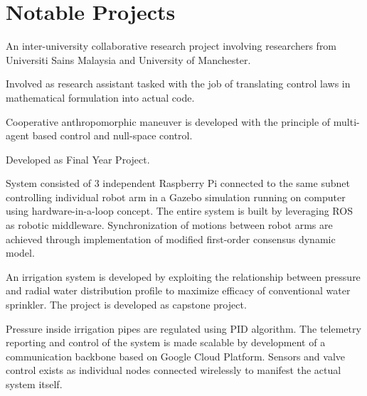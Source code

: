 \documentclass[letterpaper]{deedy-resume} %
\begin{document}
\begin{minipage}[t]{0.66\textwidth} %

\section{Notable Projects}

\vspace{\topsep}
\begin{tightitemize}
\item An inter-university collaborative research project involving researchers from Universiti Sains Malaysia and University of Manchester.
\item Involved as research assistant tasked with the job of translating control laws in mathematical formulation into actual code.
\item Cooperative anthropomorphic maneuver is developed with the principle of multi-agent based control and null-space control.
\end{tightitemize} 
\sectionspace %

\vspace{\topsep}
\begin{tightitemize}
\item Developed as Final Year Project.
\item System consisted of 3 independent Raspberry Pi connected to the same subnet controlling individual robot arm in a Gazebo simulation running on computer using hardware-in-a-loop concept. 
The entire system is built by leveraging ROS as robotic middleware. 
Synchronization of motions between robot arms are achieved through implementation of modified first-order consensus dynamic model.
\end{tightitemize} 
\sectionspace %

\vspace{\topsep}
\begin{tightitemize}
\item An irrigation system is developed by exploiting the relationship between pressure and radial water distribution profile to maximize efficacy of conventional water sprinkler. 
The project is developed as capstone project.
\item Pressure inside irrigation pipes are regulated using PID algorithm. 
The telemetry reporting and control of the system is made scalable by development of a communication backbone based on Google Cloud Platform.
Sensors and valve control exists as individual nodes connected wirelessly to manifest the actual system itself.
\end{tightitemize} 
\sectionspace %


\end{minipage}
\end{document}
